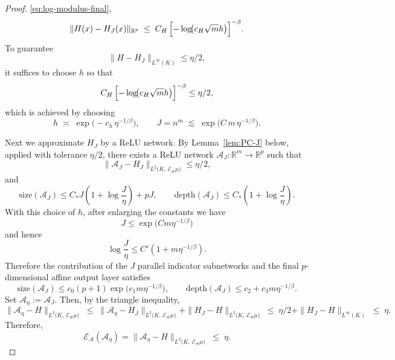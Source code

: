 \documentclass{article}
\numberwithin{equation}{section}
\theoremstyle{plain}
\begin{document}
\begin{proof}
		\eqref{eq:log-modulus-final},
		\begin{equation*}
			\|H(x)-H_J(x)\|_{\mathbb R^{p}}
			\;\le\;
			C_H\,\Bigl[-\log\!\bigl(c_H \sqrt{m} h\bigr)\Bigr]^{-\beta}.
		\end{equation*}
		To guarantee
		\begin{equation*}
			\|H - H_J\|_{L^\infty(K)} \le \eta/2,
		\end{equation*}
		it suffices to choose $h$ so that
		\begin{equation*}
			C_H\,\Bigl[-\log\!\bigl(c_H \sqrt{m} h\bigr)\Bigr]^{-\beta} \le \eta/2,
		\end{equation*}
		which is achieved by choosing
		\begin{equation*}
			h \;\asymp\; \exp \bigl(-c_h\,\eta^{-1/\beta}\bigr),
			\qquad
			J=n^{m}\;\lesssim\;\exp \bigl(C\,m\,\eta^{-1/\beta}\bigr).
		\end{equation*}
		
		Next we approximate $H_J$ by a ReLU network.  
		By Lemma~\ref{lem:PC-J} below, applied with tolerance $\eta/2$, there exists a ReLU
		network $\mathcal A_J:\mathbb{R}^{m}\to\mathbb{R}^{p}$ such that
		\begin{equation*}
			\|\mathcal A_J - H_J\|_{L^{2}\!\bigl(K,\,\mathcal{E}_{\#}\mu\bigr)} \le \eta/2,
		\end{equation*}
		and
		\begin{equation*}
			\mathrm{size}(\mathcal A_J)
			\le
			C_*J\left(1+\log\frac{J}{\eta}\right)+pJ,
			\qquad
			\mathrm{depth}(\mathcal A_J)
			\le
			C_*\left(1+\log\frac{J}{\eta}\right).
		\end{equation*}
		With this choice of $h$, after enlarging the constants we have
		\begin{equation*}
			J\le \exp \bigl(Cm\eta^{-1/\beta}\bigr)
		\end{equation*}
		and hence
		\begin{equation*}
			\log\frac{J}{\eta}
			\le C'\left(1+m\eta^{-1/\beta}\right).
		\end{equation*}
		Therefore the contribution of the $J$ parallel indicator subnetworks and the final $p$-dimensional affine output layer satisfies
		\begin{equation*}
			\mathrm{size}(\mathcal A_J)
			\le c_0(p+1)\exp \bigl(c_1m\eta^{-1/\beta}\bigr),
			\qquad
			\mathrm{depth}(\mathcal A_J)
			\le c_2+c_3m\eta^{-1/\beta}.
		\end{equation*}
		Set $\mathcal A_{\eta}:=\mathcal A_J$. Then, by the triangle
		inequality,
		\begin{equation*}
			\|\mathcal A_{\eta} - H\|_{L^{2}\!\bigl(K,\,\mathcal{E}_{\#}\mu\bigr)}
			\;\le\;
			\|\mathcal A_{\eta} - H_J\|_{L^{2}\!\bigl(K,\,\mathcal{E}_{\#}\mu\bigr)}
			+
			\|H_J - H\|_{L^{2}\!\bigl(K,\,\mathcal{E}_{\#}\mu\bigr)}
			\;\le\;
			\eta/2 + \|H_J - H\|_{L^{\infty}(K)}
			\;\le\;
			\eta.
		\end{equation*}
		Therefore,
		\begin{equation*}
			\mathscr{E}_{\mathcal{A}}(\mathcal A_\eta)
			=
			\|\mathcal A_\eta - H\|_{L^{2}\!\bigl(K,\,\mathcal{E}_{\#}\mu\bigr)}
			\;\le\;
			\eta.
		\end{equation*}
		

\end{proof}
\end{document}

